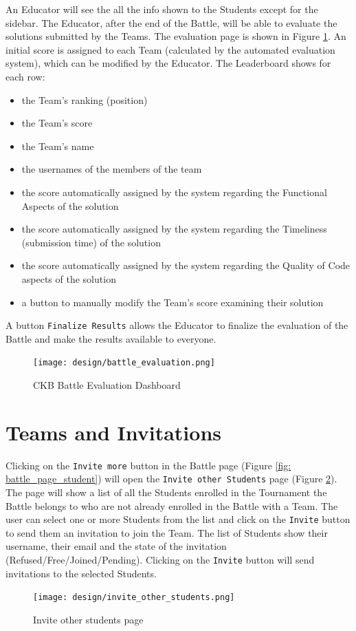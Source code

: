 An Educator will see the all the info shown to the Students except for the sidebar.
The Educator, after the end of the Battle, will be able to evaluate the solutions submitted by the Teams.
The evaluation page is shown in Figure \ref{fig: battle_eval}.
An initial score is assigned to each Team (calculated by the automated evaluation system), which can be modified by the Educator. 
The Leaderboard shows for each row:
\begin{itemize}
    \item the Team's ranking (position)
    \item the Team's score
    \item the Team's name
    \item the usernames of the members of the team
    \item the score automatically assigned by the system regarding the Functional Aspects of the solution
    \item the score automatically assigned by the system regarding the Timeliness (submission time) of the solution
    \item the score automatically assigned by the system regarding the Quality of Code aspects of the solution
    \item a button to manually modify the Team's score examining their solution
\end{itemize}
A button \verb|Finalize Results| allows the Educator to finalize the evaluation of the Battle and make the results available to everyone.
\begin{figure} [H]
    \begin{center}
        \texttt{[image: design/battle\_evaluation.png]}
        \caption{CKB Battle Evaluation Dashboard}
        \label{fig: battle_eval}
    \end{center}
\end{figure}




\section{Teams and Invitations}
\label{sec: teams_invitations}%

Clicking on the \verb|Invite more| button in the Battle page (Figure \ref{fig: battle_page_student}) will open the \verb|Invite other Students| page (Figure \ref{fig: invite_others}).
The page will show a list of all the Students enrolled in the Tournament the Battle belongs to who are not already enrolled in the Battle with a Team. 
The user can select one or more Students from the list and click on the \verb|Invite| button to send them an invitation to join the Team. 
The list of Students show their username, their email and the state of the invitation (Refused/Free/Joined/Pending).
Clicking on the \verb|Invite| button will send invitations to the selected Students.
\begin{figure} [H]
    \begin{center}
        \texttt{[image: design/invite\_other\_students.png]}
        \caption{Invite other students page}
        \label{fig: invite_others}
    \end{center}
\end{figure}


